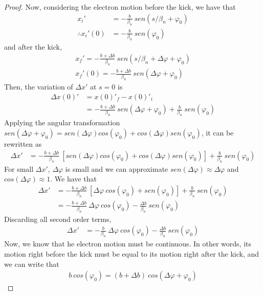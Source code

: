 \begin{proof}
	Now, considering the electron motion before the kick, we have that
	\begin{align*}
		x_i' &= -\frac{b}{\beta_n}\ sen(s/\beta_n + \varphi_0)\\
		\therefore x_i'(0) &= -\frac{b}{\beta_n}\ sen(\varphi_0)
	\end{align*}
	and after the kick,
	\begin{align*}
		x_f' = -\frac{b+\Delta b}{\beta_n}\ sen(s/\beta_n + \Delta \varphi + \varphi_0)\\
		x_f'(0) = -\frac{b+\Delta b}{\beta_n}\ sen(\Delta \varphi + \varphi_0)
	\end{align*}
	Then, the variation of $\Delta x'$ at $s=0$ is
	\begin{align*}
		\Delta x(0)' &= x(0)'_f - x(0)'_i\\
				  &= -\frac{b+\Delta b}{\beta_n}\ sen(\Delta \varphi + \varphi_0) + \frac{b}{\beta_n}\ sen(\varphi_0)
	\end{align*}
	Applying the angular transformation $sen(\Delta \varphi + \varphi_0) = sen(\Delta \varphi)cos(\varphi_0) + cos(\Delta \varphi)sen(\varphi_0)$, it can be rewritten as
	\begin{align*}
		\Delta x' &= -\frac{b+\Delta b}{\beta_n}\ [sen(\Delta \varphi)cos(\varphi_0) + cos(\Delta \varphi)sen(\varphi_0)] + \frac{b}{\beta_n}\ sen(\varphi_0)
	\end{align*}
	For small $\Delta x'$, $\Delta \varphi$ is small and we can approximate $sen(\Delta \varphi) \approx \Delta \varphi$ and $cos(\Delta \varphi) \approx 1$. We have that
	\begin{align*}
		\Delta x' &= -\frac{b+\Delta b}{\beta_n}\ [\Delta \varphi\ cos(\varphi_0) + sen(\varphi_0)] + \frac{b}{\beta_n}\ sen(\varphi_0)\\
				  &= -\frac{b+\Delta b}{\beta_n}\ \Delta \varphi\ cos(\varphi_0) - \frac{\Delta b}{\beta_n}\ sen(\varphi_0)
	\end{align*}
	Discarding all second order terms,
	\begin{align*}
		\Delta x' &= -\frac{b}{\beta_n}\ \Delta \varphi\ cos(\varphi_0) - \frac{\Delta b}{\beta_n}\ sen(\varphi_0)
	\end{align*}
	Now, we know that he electron motion must be continuous. In other words, its motion right before the kick must be equal to its motion right after the kick, and we can write that
	\begin{align*}
		b\ cos(\varphi_0) = (b+\Delta b)\ cos(\Delta \varphi + \varphi_0)
	\end{align*}

\end{proof}
